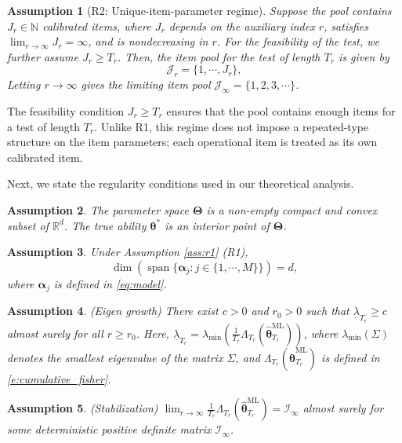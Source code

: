 \documentclass[12pt]{article}
\newcommand{\bfalpha}{\boldsymbol{\alpha}}
\newcommand{\bftheta}{\boldsymbol{\theta}}
\newtheorem{assumption}{Assumption}
\begin{document}
\begin{assumption}[R2: Unique-item-parameter regime]
\label{ass:r2}
Suppose the pool contains $J_r \in \mathbb{N}$ calibrated items, where $J_r$ depends on the auxiliary index $r$, satisfies $\lim_{r \to \infty} J_r = \infty$, and is nondecreasing in $r$. For the feasibility of the test, we further assume $J_r \geq T_r$. Then, the item pool for the test of length $T_r$ is given by
\begin{equation} \label{e:r2}
\mathcal{J}_{r} = \{1, \cdots, J_r\},
\end{equation}
Letting $r \to \infty$ gives the limiting item pool $\mathcal{J}_{\infty} = \{1,2,3, \cdots \}$.
\end{assumption}
The feasibility condition $J_r \geq T_r$ ensures that the pool contains enough items for a test of length $T_r$. Unlike R1, this regime does not impose a repeated-type structure on the item parameters; each operational item is treated as its own calibrated item.

Next, we state the regularity conditions used in our theoretical analysis.


\begin{assumption} \label{ass:compact} 
The parameter space $\boldsymbol{\Theta}$ is a non-empty compact and convex subset of $\mathbb{R}^d$. The true ability $\bftheta^{\ast}$ is an interior point of $\boldsymbol{\Theta}$.
\end{assumption}

\begin{assumption} \label{ass:dimension}
Under Assumption \ref{ass:r1} (R1), 
$$
\operatorname{dim}( \operatorname{span} \{ \bfalpha_j : j \in \{1,\cdots,M\} \}) = d,
$$
where $\bfalpha_j$ is defined in \eqref{eq:model}. 
\end{assumption}

\begin{assumption} \label{ass:information1} (Eigen growth) There exist $c>0$ and $r_0 > 0$ such that $\underline\lambda_{T_r} \geq c$ almost surely for all $r \ge r_0$. Here, $\underline\lambda_{T_r} = \lambda_{\min}(\frac{1}{T_r} \Lambda_{T_r}( \hat{\bftheta}_{T_{r}}^{\mathrm{ML}} ))$, where $\lambda_{\min}(\Sigma)$ denotes the smallest eigenvalue of the matrix $\Sigma$, and $\Lambda_{T_r}(  \hat{\bftheta}_{T_r}^{\mathrm{ML}}  )$ is defined in \eqref{e:cumulative_fisher}. 
\end{assumption}

\begin{assumption} \label{ass:information2} (Stabilization) $\lim_{r \to \infty} \frac{1}{T_r} \Lambda_{T_r}( \hat{\bftheta}_{T_r}^{\mathrm{ML}} ) = \mathcal I_{\infty}$ almost surely for some deterministic positive definite matrix $\mathcal I_\infty$.
\end{assumption}
\end{document}
